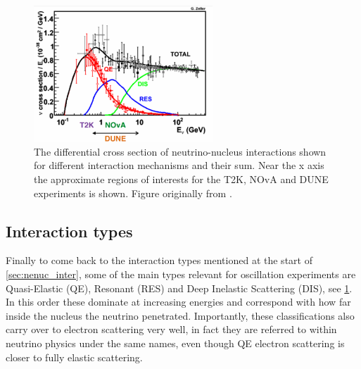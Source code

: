 \documentclass[a4paper,12pt]{article}
\begin{document}
\begin{figure}[H]
    \centering
    \includegraphics[width=0.6\textwidth]{figures/sigmaVsEnu.pdf}
    \caption{
        The differential cross section of neutrino-nucleus interactions shown for different interaction mechanisms and their sum.
        Near the x axis the approximate regions of interests for the T2K, NOvA and DUNE experiments is shown.
        Figure originally from \cite{formaggioEVEeVNeutrino2012}.
    }\label{fig:nusigma_vs_Enu}
\end{figure}

\subsection{Interaction types}\label{sec:inttyp}
Finally to come back to the interaction types mentioned at the start of \cref{sec:nenuc_inter}, some of the main types relevant for oscillation experiments are Quasi-Elastic (QE), Resonant (RES) and Deep Inelastic Scattering (DIS), see \cref{fig:nusigma_vs_Enu}.
In this order these dominate at increasing energies and correspond with how far inside the nucleus the neutrino penetrated.
Importantly, these classifications also carry over to electron scattering very well, in fact they are referred to within neutrino physics under the same names, even though QE electron scattering is closer to fully elastic scattering.
\end{document}
